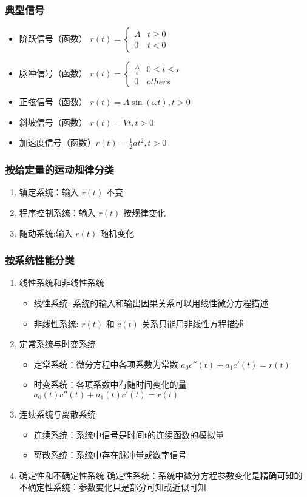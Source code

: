 \documentclass{beamer}
\begin{document}
\begin{frame}
\frametitle{典型信号}
\label{sec-1-4}

\begin{itemize}
\item <2->阶跃信号（函数）  $r(t)=\begin{cases} A & t\geq 0 \\ 0 & t < 0 \end{cases}$
\item <3->脉冲信号（函数）  $r(t)=\begin{cases}\frac{A}{\epsilon}  & 0\leq t\leq \epsilon\\ 0 & others\end{cases}$
\item <4->正弦信号（函数）  $r(t)=A\sin(\omega t), t>0$
\item <5->斜坡信号（函数）  $r(t)=Vt  ,     t>0$
\item <6->加速度信号（函数）$r(t)=\frac{1}{2}at^2,  t>0$
\end{itemize}
\end{frame}
\begin{frame}
\frametitle{按给定量的运动规律分类}
\label{sec-1-5}

\begin{enumerate}
\item <2->镇定系统：输入 $r(t)$ 不变
\item <3->程序控制系统：输入 $r(t)$ 按规律变化
\item <4->随动系统:输入 $r(t)$ 随机变化
\end{enumerate}
\end{frame}
\begin{frame}
\frametitle{按系统性能分类}
\label{sec-1-6}

\begin{enumerate}
\item <2->线性系统和非线性系统
\begin{itemize}
\item 线性系统: 系统的输入和输出因果关系可以用线性微分方程描述
\item 非线性系统: $r(t)$ 和 $c(t)$ 关系只能用非线性方程描述
\end{itemize}
\item <3->定常系统与时变系统
\begin{itemize}
\item 定常系统：微分方程中各项系数为常数 $a_0c''(t)+a_1c'(t)=r(t)$
\item 时变系统：各项系数中有随时间变化的量 $a_0(t)c''(t)+a_1(t)c'(t)=r(t)$
\end{itemize}
\item <4->连续系统与离散系统
\begin{itemize}
\item 连续系统：系统中信号是时间t的连续函数的模拟量
\item 离散系统：系统中存在脉冲量或数字信号
\end{itemize}
\item <5->确定性和不确定性系统
    确定性系统：系统中微分方程参数变化是精确可知的
    不确定性系统：参数变化只是部分可知或近似可知
\end{enumerate}
\end{frame}
\end{document}
